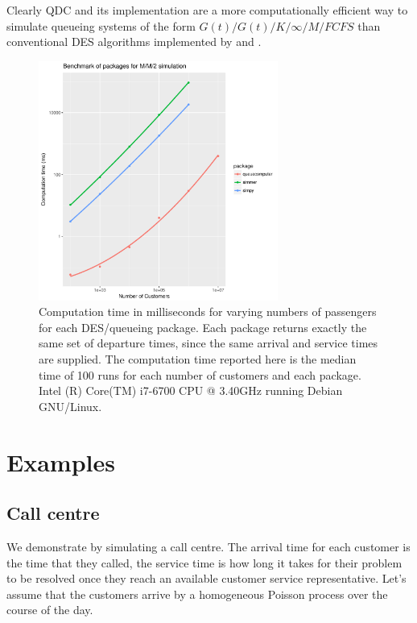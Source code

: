 \documentclass[article]{jss}
\begin{document}
Clearly QDC and its implementation  are a more computationally efficient way to simulate queueing systems of the form $G(t)/G(t)/K/\infty/M/FCFS$ than conventional DES algorithms implemented by  and . 

\begin{figure}[!htb]
  \centering
  \includegraphics[width = 0.7\textwidth]{figures/benchmark_081.pdf}
  \caption{Computation time in milliseconds for varying numbers of passengers for each DES/queueing package. Each package returns exactly the same set of departure times, since the same arrival and service times are supplied. The computation time reported here is the median time of 100 runs for each number of customers and each package. Intel (R) Core(TM) i7-6700
CPU @ 3.40GHz running Debian GNU/Linux.
 }
  \label{fig:bm_numberofpassengers}
\end{figure}

\section{Examples} \label{sec:Examples}

\subsection{Call centre} \label{ssec:callcentre}

We demonstrate  by simulating a call centre. The arrival time for each customer is the time that they called, the service time is how long it takes for their problem to be resolved once they reach an available customer service representative. Let's assume that the customers arrive by a homogeneous Poisson process over the course of the day. 
\end{document}
